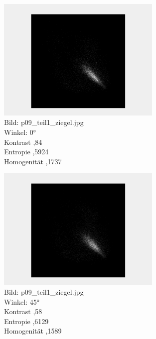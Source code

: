\documentclass[12pt]{article}
\begin{document}
\begin{figure}[H]
  \centering
  \includegraphics[width=0.7\textwidth, keepaspectratio]{texture_b1.png}\\
  Bild: p09\_teil1\_ziegel.jpg\\
  Winkel: 0°\\
  Kontrast ,84\\
  Entropie ,5924\\
  Homogenität ,1737
\end{figure}
\begin{figure}[H]
  \centering
  \includegraphics[width=0.7\textwidth, keepaspectratio]{texture_b2.png}\\
  Bild: p09\_teil1\_ziegel.jpg\\
  Winkel: 45°\\
  Kontrast ,58\\
  Entropie ,6129\\
  Homogenität ,1589
\end{figure}
\end{document}
